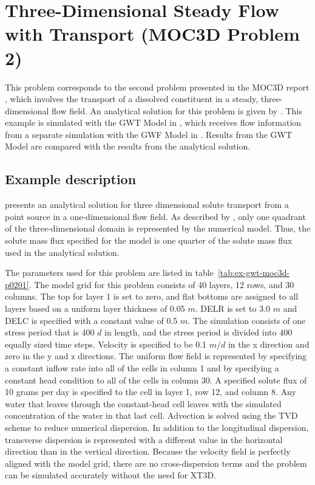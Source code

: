 \section{Three-Dimensional Steady Flow with Transport (MOC3D Problem 2)}

This problem corresponds to the second problem presented in the MOC3D report \cite{konikow1996three}, which involves the transport of a dissolved constituent in a steady, three-dimensional flow field.  An analytical solution for this problem is given by \cite{wexler1992}.  This example is simulated with the GWT Model in \mf, which receives flow information from a separate simulation with the GWF Model in \mf.  Results from the GWT Model are compared with the results from the \cite{wexler1992} analytical solution.

\subsection{Example description}
\cite{wexler1992} presents an analytical solution for three dimensional solute transport from a point source in a one-dimensional flow field.  As described by \cite{konikow1996three}, only one quadrant of the three-dimensional domain is represented by the numerical model.  Thus, the solute mass flux specified for the model is one quarter of the solute mass flux used in the analytical solution.  

The parameters used for this problem are listed in table~\ref{tab:ex-gwt-moc3d-p0201}.  The model grid for this problem consists of 40 layers, 12 rows, and 30 columns.  The top for layer 1 is set to zero, and flat bottoms are assigned to all layers based on a uniform layer thickness of 0.05 $m$.  DELR is set to 3.0 $m$ and DELC is specified with a constant value of 0.5 $m$.  The simulation consists of one stress period that is 400 $d$ in length, and the stress period is divided into 400 equally sized time steps.  Velocity is specified to be 0.1 $m/d$ in the x direction and zero in the y and z directions.  The uniform flow field is represented by specifying a constant inflow rate into all of the cells in column 1 and by specifying a constant head condition to all of the cells in column 30.  A specified solute flux of 10 grams per day is specified to the cell in layer 1, row 12, and column 8.  Any water that leaves through the constant-head cell leaves with the simulated concentration of the water in that last cell.   Advection is solved using the TVD scheme to reduce numerical dispersion.  In addition to the longitudinal dispersion, transverse dispersion is represented with a different value in the horizontal direction than in the vertical direction.  Because the velocity field is perfectly aligned with the model grid, there are no cross-dispersion terms and the problem can be simulated accurately without the need for XT3D.

